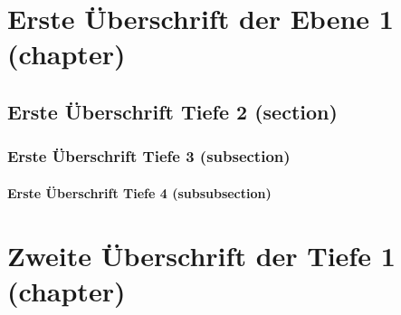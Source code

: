 \documentclass[MMR,Master,ngerman]{twbook}%
\begin{document}
{{{    \newcommand{\citefigm}[2]{(Source: taken with modification from \protect\cite{#1}, p. #2)}%
    \newcommand{\citep}{\citeasnoun}%
    \newcommand{\acessedthrough}{Available at:}%
    \newcommand{\acessedthroughp}{Available through:}%
    \newcommand{\acessedat}{Accessed}%
    \newcommand{\singlepage}{p.}%
    \newcommand{\multiplepages}{pp.}%
    \newcommand{\chapternr}{Ch.}%
    \renewcommand{\harvardand}{\&}%
    \newcommand{\abstractonly}{Abstract only}
    \newcommand{\edition}{~edition}%
}}}

\maketitle

%
%

\chapter{Erste Überschrift der Ebene 1 (chapter)}
\blinddocument

\blindmathpaper

\section{Erste Überschrift Tiefe 2 (section)}
\blindtext

\subsection{Erste Überschrift Tiefe 3 (subsection)}
\blindtext

\subsubsection{Erste Überschrift Tiefe 4 (subsubsection)}
\blindtext

\chapter{Zweite Überschrift der Tiefe 1 (chapter)}
\blindtext
\end{document}
